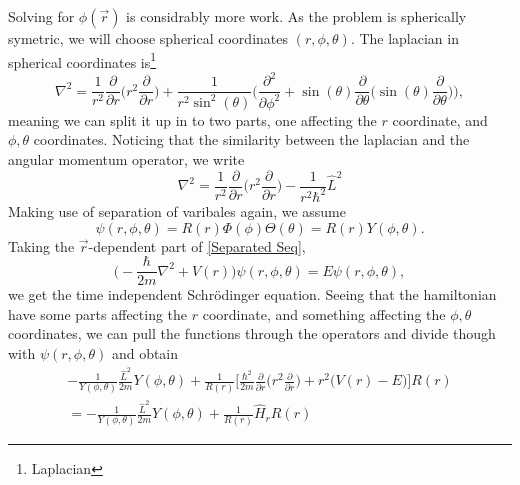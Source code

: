 \documentclass{article}
\begin{document}
        Solving for \(\phi(\vec r)\) is considrably more work. As the problem is spherically symetric, we will choose spherical coordinates \((r, \phi, \theta)\). The laplacian in spherical coordinates is\footnote{Laplacian}
        \begin{equation*}
            \nabla^2 = \frac{1}{r^2}\frac{\partial}{\partial r} \bigg(r^2 \frac{\partial}{\partial r}\bigg) + \frac{1}{r^2\sin^2(\theta)}\bigg(\frac{\partial^2}{\partial \phi^2} + \sin(\theta)\frac{\partial}{\partial \theta}\bigg( \sin(\theta) \frac{\partial}{\partial \theta}\bigg) \bigg), 
        \end{equation*}
        meaning we can split it up in to two parts, one affecting the \(r\) coordinate, and \(\phi, \theta\) coordinates. Noticing that the similarity between the laplacian and the angular momentum operator, we write
        \begin{equation*}
            \nabla^2 = \frac{1}{r^2}\frac{\partial}{\partial r}\bigg(r^2\frac{\partial}{\partial r} \bigg) - \frac{1}{r^2 \hbar^2} {\hat L}^2
        \end{equation*}
        Making use of separation of varibales again, we assume
        \begin{equation*}
            \psi(r, \phi, \theta) = R(r)\Phi(\phi)\Theta(\theta) = R(r)Y(\phi, \theta).
        \end{equation*}
        Taking the \(\vec r\)-dependent part of \eqref{Separated Seq},
        \begin{equation}
            \label{TUSL}
            \Big(-\frac{\hbar}{2 m} \nabla^2 + V(r) \Big) \psi(r, \phi, \theta) = E \psi(r, \phi, \theta),
        \end{equation}
        we get the time independent Schrödinger equation. Seeing that the hamiltonian have some parts affecting the \(r\) coordinate, and something affecting the \(\phi, \theta\) coordinates, we can pull the functions through the operators and divide though with \(\psi(r, \phi, \theta)\) and obtain
        \begin{align*}
            -\frac{1}{Y(\phi, \theta)}\frac{{\hat L}^2}{2m} Y(\phi, \theta) + \frac{1}{R(r)}\bigg[\frac{\hbar^2}{2m}\frac{\partial}{\partial r}\bigg(r^2\frac{\partial}{\partial r} \bigg) + r^2 \big(V(r) - E)\bigg] R(r) \\ = -\frac{1}{Y(\phi, \theta)}\frac{{\hat L}^2}{2m} Y(\phi, \theta) + \frac{1}{R(r)}\hat H_r R(r)
        \end{align*}
\end{document}

